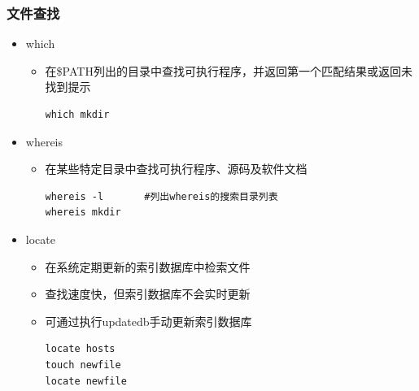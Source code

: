 \documentclass[xcolor=svgnames,presentation]{beamer}
\begin{document}
\begin{frame}[fragile]
\frametitle{文件查找}
\label{sec-1-1-6}
\begin{itemize}

\item which
\label{sec-1-1-6-1}%
\begin{itemize}

\item 在\$PATH列出的目录中查找可执行程序，并返回第一个匹配结果或返回未找到提示\\
\label{sec-1-1-6-1-1}%
\begin{verbatim}
which mkdir
\end{verbatim}
\end{itemize} %

\item whereis
\label{sec-1-1-6-2}%
\begin{itemize}

\item 在某些特定目录中查找可执行程序、源码及软件文档\\
\label{sec-1-1-6-2-1}%
\begin{verbatim}
whereis -l       #列出whereis的搜索目录列表
whereis mkdir
\end{verbatim}
\end{itemize} %

\item locate
\label{sec-1-1-6-3}%
\begin{itemize}

\item 在系统定期更新的索引数据库中检索文件
\label{sec-1-1-6-3-1}%

\item 查找速度快，但索引数据库不会实时更新
\label{sec-1-1-6-3-2}%

\item 可通过执行updatedb手动更新索引数据库\\
\label{sec-1-1-6-3-3}%
\begin{verbatim}
locate hosts
touch newfile
locate newfile
\end{verbatim}
\end{itemize} %
\end{itemize} %
\end{frame}
\end{document}

